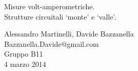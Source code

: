 \begin{center}

     	{\huge Misure volt-amperometriche.\\}
     	\vspace{0.2cm}
     	{\huge Strutture circuitali `monte' e `valle'.}
	\vspace{0.3cm}

      	{\large Alessandro Martinelli, Davide Bazzanella} \\
      	{Bazzanella.Davide@gmail.com} \\
		{\large Gruppo B11} \\
	
	\vspace{0.1cm}
      	{\large 4 marzo 2014}

\end{center}
